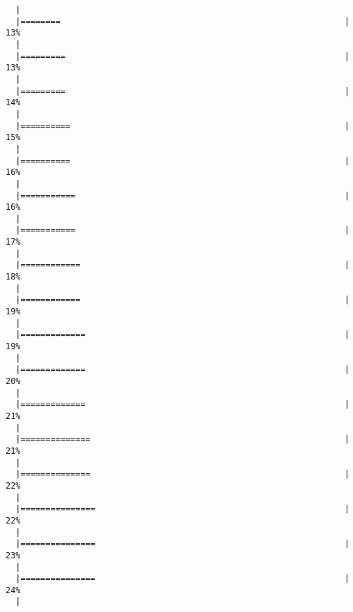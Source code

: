 \documentclass[a4paper]{article}
\begin{document}
\begin{verbatim}
  |                                                                       
  |========                                                         |  13%
  |                                                                       
  |=========                                                        |  13%
  |                                                                       
  |=========                                                        |  14%
  |                                                                       
  |==========                                                       |  15%
  |                                                                       
  |==========                                                       |  16%
  |                                                                       
  |===========                                                      |  16%
  |                                                                       
  |===========                                                      |  17%
  |                                                                       
  |============                                                     |  18%
  |                                                                       
  |============                                                     |  19%
  |                                                                       
  |=============                                                    |  19%
  |                                                                       
  |=============                                                    |  20%
  |                                                                       
  |=============                                                    |  21%
  |                                                                       
  |==============                                                   |  21%
  |                                                                       
  |==============                                                   |  22%
  |                                                                       
  |===============                                                  |  22%
  |                                                                       
  |===============                                                  |  23%
  |                                                                       
  |===============                                                  |  24%
  |                                                                       

\end{verbatim}
\end{document}
